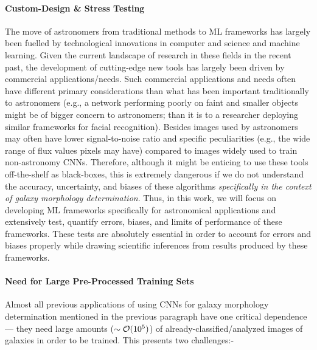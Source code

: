 \paragraph{Custom-Design \& Stress Testing} The move of astronomers from traditional methods to ML frameworks has largely been fuelled by technological innovations in computer and science and machine learning. Given the current landscape of research in these fields in the recent past, the development of cutting-edge new tools has largely been driven by commercial applications/needs. Such commercial applications and needs often have different primary considerations than what has been important traditionally to astronomers (e.g., a network performing poorly on faint and smaller objects might be of bigger concern to astronomers; than it is to a researcher deploying similar frameworks for facial recognition). Besides images used by astronomers may often have lower signal-to-noise ratio and specific peculiarities (e.g., the wide range of flux values pixels may have) compared to images widely used to train non-astronomy CNNs. Therefore, although it might be enticing to use these tools off-the-shelf as black-boxes, this is extremely dangerous if we do not understand the accuracy, uncertainty, and biases of these algorithms \textit{specifically in the context of galaxy morphology determination}. Thus, in this work, we will focus on developing ML frameworks specifically for astronomical applications and extensively test, quantify errors, biases, and limits of performance of these frameworks. These tests are absolutely essential in order to account for errors and biases properly while drawing scientific inferences from results produced by these frameworks. 

\paragraph{Need for Large Pre-Processed Training Sets} Almost all previous applications of using CNNs for galaxy morphology determination mentioned in the previous paragraph have one critical dependence --- they need large amounts ($\sim \mathcal{O}(10^{5})$) of already-classified/analyzed images of galaxies in order to be trained. This presents two challenges:- 

